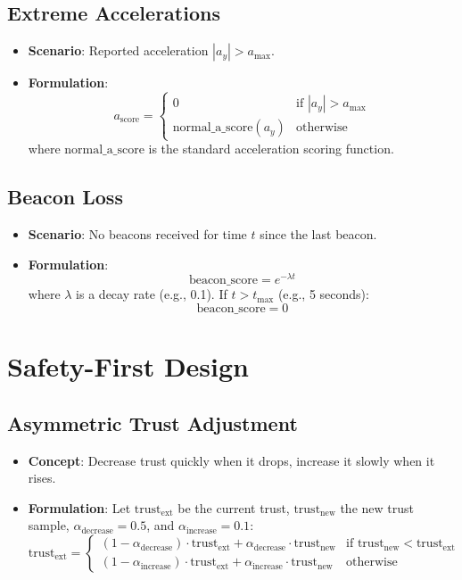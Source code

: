 \documentclass{article}
\begin{document}
\subsection{Extreme Accelerations}
\begin{itemize}
    \item \textbf{Scenario}: Reported acceleration $|a_y| > a_{\text{max}}$.
    \item \textbf{Formulation}:
    \[
    a_{\text{score}} = 
    \begin{cases} 
    0 & \text{if } |a_y| > a_{\text{max}} \\
    \text{normal\_a\_score}(a_y) & \text{otherwise}
    \end{cases}
    \]
    where $\text{normal\_a\_score}$ is the standard acceleration scoring function.
\end{itemize}

\subsection{Beacon Loss}
\begin{itemize}
    \item \textbf{Scenario}: No beacons received for time $t$ since the last beacon.
    \item \textbf{Formulation}:
    \[
    \text{beacon\_score} = e^{-\lambda t}
    \]
    where $\lambda$ is a decay rate (e.g., 0.1). If $t > t_{\text{max}}$ (e.g., 5 seconds):
    \[
    \text{beacon\_score} = 0
    \]
\end{itemize}

\section{Safety-First Design}

\subsection{Asymmetric Trust Adjustment}
\begin{itemize}
    \item \textbf{Concept}: Decrease trust quickly when it drops, increase it slowly when it rises.
    \item \textbf{Formulation}:  
    Let $\text{trust}_{\text{ext}}$ be the current trust, $\text{trust}_{\text{new}}$ the new trust sample, $\alpha_{\text{decrease}} = 0.5$, and $\alpha_{\text{increase}} = 0.1$:
    \[
    \text{trust}_{\text{ext}} = 
    \begin{cases}
    (1 - \alpha_{\text{decrease}}) \cdot \text{trust}_{\text{ext}} + \alpha_{\text{decrease}} \cdot \text{trust}_{\text{new}} & \text{if } \text{trust}_{\text{new}} < \text{trust}_{\text{ext}} \\
    (1 - \alpha_{\text{increase}}) \cdot \text{trust}_{\text{ext}} + \alpha_{\text{increase}} \cdot \text{trust}_{\text{new}} & \text{otherwise}
    \end{cases}
    \]
\end{itemize}
\end{document}
